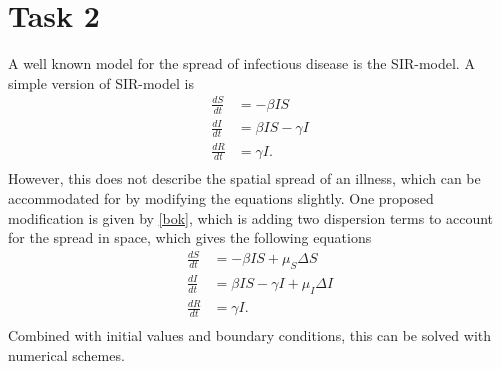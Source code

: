 \section{Task 2}

A well known model for the spread of infectious disease is the SIR-model. A simple version of SIR-model is
\begin{equation}
    \begin{split}
        \frac{dS}{dt} &= -\beta I S \\
        \frac{dI}{dt} &= \beta IS - \gamma I \\
        \frac{dR}{dt} &= \gamma I. \\
    \end{split}
\end{equation}
However, this does not describe the spatial spread of an illness, which can be accommodated for by modifying the equations slightly. One proposed modification is given by \ref{bok}, which is adding
two dispersion terms to account for the spread in space, which gives the following equations
\begin{equation}
    \begin{split}
        \frac{dS}{dt} &= -\beta I S + \mu_S \Delta S \\
        \frac{dI}{dt} &= \beta IS - \gamma I + \mu_I \Delta I\\
        \frac{dR}{dt} &= \gamma I. \\
    \end{split}
\end{equation}
Combined with initial values and boundary conditions, this can be solved with numerical schemes.

